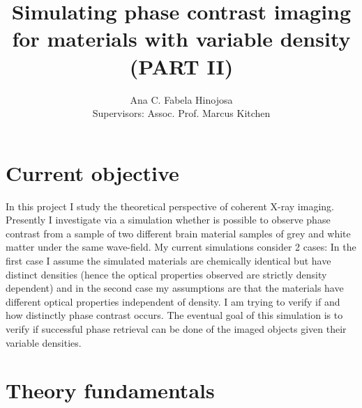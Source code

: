 \documentclass[9pt, a4paper]{article}
\title{Simulating phase contrast imaging for materials with variable density (PART II)}
\author{Ana C. Fabela Hinojosa \\
\small{Supervisors: Assoc. Prof. Marcus Kitchen}}
\begin{document}
\maketitle
\section{Current objective}
In this project I study the theoretical perspective of coherent X-ray imaging. Presently I investigate via a simulation whether is possible to observe phase contrast from a sample of two different brain material samples of grey and white matter under the same wave-field.
My current simulations consider 2 cases: In the first case I assume the simulated materials are chemically identical but have distinct densities (hence the optical properties observed are strictly density dependent) and in the second case my assumptions are that the materials have different optical properties independent of density.  
I am trying to verify if and how distinctly phase contrast occurs. The eventual goal of this simulation is to verify if successful phase retrieval can be done of the imaged objects given their variable densities.

\section{Theory fundamentals}
\end{document}
